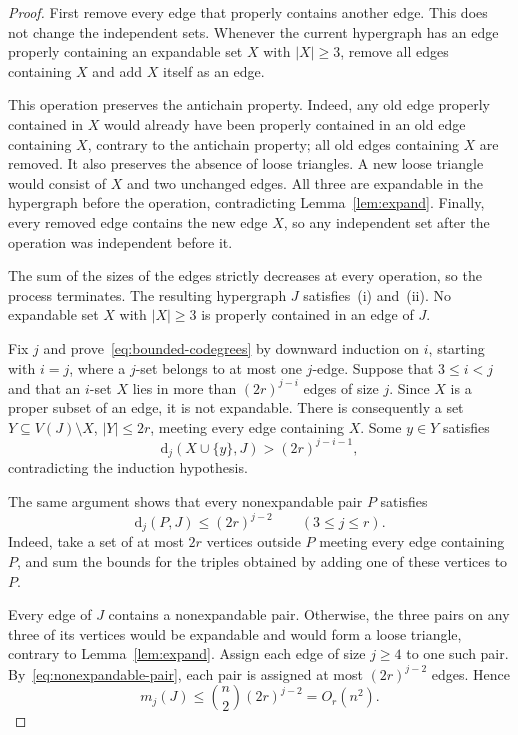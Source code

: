 \documentclass[11pt]{article}
\numberwithin{equation}{section}
\theoremstyle{remark}
\newcommand{\dd}{\mathrm d}
\begin{document}
\begin{proof}
First remove every edge that properly contains another edge. This does not change the independent sets. Whenever the current hypergraph has an edge properly containing an expandable set $X$ with $|X|\ge3$, remove all edges containing $X$ and add $X$ itself as an edge.

This operation preserves the antichain property. Indeed, any old edge properly contained in $X$ would already have been properly contained in an old edge containing $X$, contrary to the antichain property; all old edges containing $X$ are removed. It also preserves the absence of loose triangles. A new loose triangle would consist of $X$ and two unchanged edges. All three are expandable in the hypergraph before the operation, contradicting Lemma~\ref{lem:expand}. Finally, every removed edge contains the new edge $X$, so any independent set after the operation was independent before it.

The sum of the sizes of the edges strictly decreases at every operation, so the process terminates. The resulting hypergraph $J$ satisfies~\textup{(i)} and~\textup{(ii)}. No expandable set $X$ with $|X|\ge3$ is properly contained in an edge of $J$.

Fix $j$ and prove~\eqref{eq:bounded-codegrees} by downward induction on $i$, starting with $i=j$, where a $j$-set belongs to at most one $j$-edge. Suppose that $3\le i<j$ and that an $i$-set $X$ lies in more than $(2r)^{j-i}$ edges of size $j$. Since $X$ is a proper subset of an edge, it is not expandable. There is consequently a set $Y\subseteq V(J)\setminus X$, $|Y|\le2r$, meeting every edge containing $X$. Some $y\in Y$ satisfies
\[
 \dd_j(X\cup\{y\},J)>(2r)^{j-i-1},
\]
contradicting the induction hypothesis.

The same argument shows that every nonexpandable pair $P$ satisfies
\begin{equation}\label{eq:nonexpandable-pair}
 \dd_j(P,J)\le(2r)^{j-2}\qquad(3\le j\le r).
\end{equation}
Indeed, take a set of at most $2r$ vertices outside $P$ meeting every edge containing $P$, and sum the bounds for the triples obtained by adding one of these vertices to $P$.

Every edge of $J$ contains a nonexpandable pair. Otherwise, the three pairs on any three of its vertices would be expandable and would form a loose triangle, contrary to Lemma~\ref{lem:expand}. Assign each edge of size $j\ge4$ to one such pair. By~\eqref{eq:nonexpandable-pair}, each pair is assigned at most $(2r)^{j-2}$ edges. Hence
\[
 m_j(J)\le\binom n2(2r)^{j-2}=O_r(n^2).
\]
\end{proof}
\end{document}
